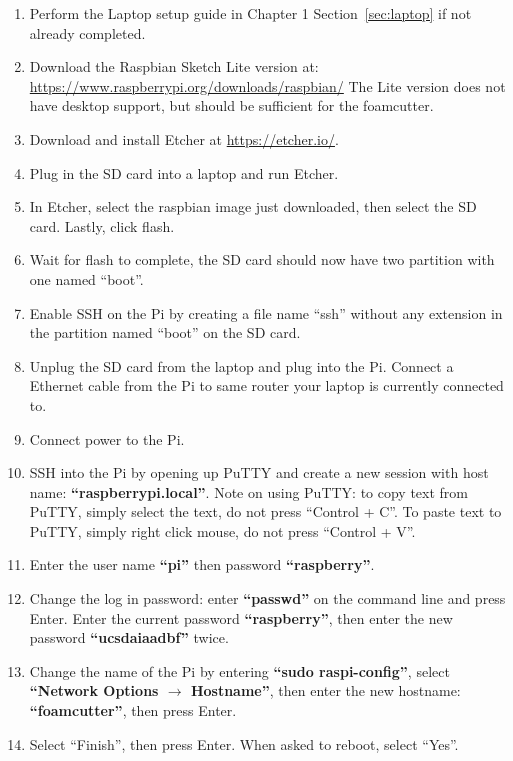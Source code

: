 \documentclass[titlepage,12pt,letter]{report}
\numberwithin{equation}{chapter}
\begin{document}
\begin{enumerate}[noitemsep,topsep=0pt]
	\item Perform the Laptop setup guide in Chapter 1 Section~\ref{sec:laptop} if not already completed.
	\item Download the Raspbian Sketch Lite version at: \\ \href{https://www.raspberrypi.org/downloads/raspbian/}{https://www.raspberrypi.org/downloads/raspbian/} The Lite version does not have desktop support, but should be sufficient for the foamcutter.
	\item Download and install Etcher at \href{https://etcher.io/}{https://etcher.io/}.
	\item Plug in the SD card into a laptop and run Etcher.
	\item In Etcher, select the raspbian image just downloaded, then select the SD card. Lastly, click flash.
	\item Wait for flash to complete, the SD card should now have two partition with one named ``boot''.
	\item Enable SSH on the Pi by creating a file name ``ssh'' without any extension in the partition named ``boot'' on the SD card.
	\item Unplug the SD card from the laptop and plug into the Pi. Connect a Ethernet cable from the Pi to same router your laptop is currently connected to.
	\item Connect power to the Pi.
	\item SSH into the Pi by opening up PuTTY and create a new session with host name: \textbf{``raspberrypi.local''}. Note on using PuTTY: to copy text from PuTTY, simply select the text, do not press ``Control + C''. To paste text to PuTTY, simply right click mouse, do not press ``Control + V''.
	\item Enter the user name \textbf{``pi''} then password \textbf{``raspberry''}.
	\item Change the log in password: enter \textbf{``passwd''} on the command line and press Enter. Enter the current password \textbf{``raspberry''}, then enter the new password \textbf{``ucsdaiaadbf''} twice.
	\item Change the name of the Pi by entering \textbf{``sudo raspi-config''}, select \textbf{``Network Options $\rightarrow$ Hostname''}, then enter the new hostname: \textbf{``foamcutter''}, then press Enter.
	\item Select ``Finish'', then press Enter. When asked to reboot, select ``Yes''.
\end{enumerate}
\end{document}
